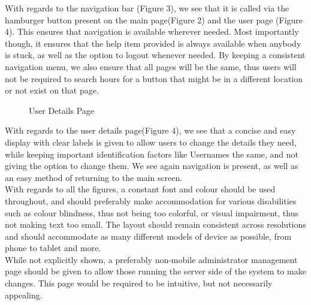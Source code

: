 \documentclass{article}
\begin{document}
				With regards to the navigation bar (Figure 3), we see that it is called via the hamburger button present on the main page(Figure 2) and the user page (Figure 4). This ensures that navigation is available wherever needed. Most importantly though, it ensures that the help item provided is always available when anybody is stuck, as well as the option to logout whenever needed. By keeping a consistent navigation menu, we also ensure that all pages will be the same, thus users will not be required to search hours for a button that might be in a different location or not exist on that page.
			
				\begin{figure}[H]
					
					\caption{User Details Page}
					
				\end{figure}
			
				With regards to the user details page(Figure 4), we see that a concise and easy display with clear labels is given to allow users to change the details they need, while keeping important identification factors like Usernames the same, and not giving the option to change them. We see again navigation is present, as well as an easy method of returning to the main screen. \\
				
				With regards to all the figures, a constant font and colour should be used throughout, and should preferably make accommodation for various disabilities such as colour blindness, thus not being too colorful, or visual impairment, thus not making text too small. The layout should remain consistent across resolutions and should accommodate as many different models of device as possible, from phone to tablet and more.\\
				
				While not explicitly shown, a preferably non-mobile administrator management page should be given to allow those running the server side of the system to make changes. This page would be required to be intuitive, but not necessarily appealing.
			
\end{document}
